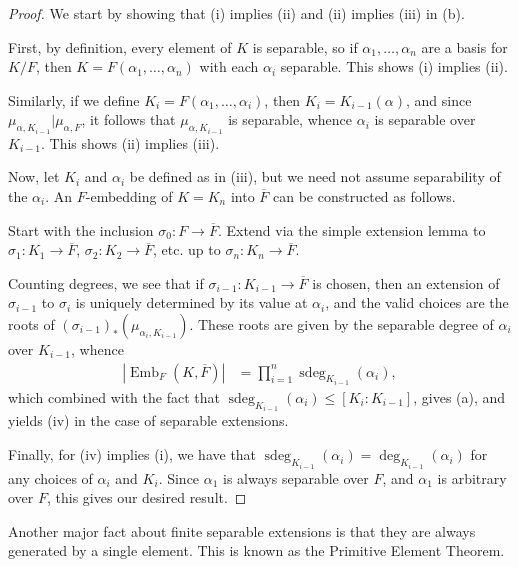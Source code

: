 \documentclass[10pt]{mypackage}
\begin{document}
\begin{proof}
  We start by showing that (i) implies (ii) and (ii) implies (iii) in (b).

  First, by definition, every element of $K$ is separable, so if $\alpha_1,\dots,\alpha_n$ are a basis for $K/F$, then $K = F\left( \alpha_1,\dots,\alpha_n \right)$ with each $\alpha_i$ separable. This shows (i) implies (ii).

  Similarly, if we define $K_i = F\left( \alpha_1,\dots,\alpha_i \right)$, then $K_i = K_{i-1}\left( \alpha \right)$, and since $\mu_{\alpha,K_{i-1}}|\mu_{\alpha,F}$, it follows that $\mu_{\alpha,K_{i-1}}$ is separable, whence $\alpha_i$ is separable over $K_{i-1}$. This shows (ii) implies (iii).

  Now, let $K_i$ and $\alpha_i$ be defined as in (iii), but we need not assume separability of the $\alpha_i$. An $F$-embedding of $K = K_n$ into $ \overline{F} $ can be constructed as follows.

  Start with the inclusion $\sigma_0\colon F\rightarrow \overline{F}$. Extend via the simple extension lemma to $\sigma_1\colon K_1\rightarrow \overline{F}$, $\sigma_2\colon K_2\rightarrow \overline{F}$, etc. up to $\sigma_n\colon K_n\rightarrow \overline{F}$.
  
  Counting degrees, we see that if $\sigma_{i-1}\colon K_{i-1}\rightarrow \overline{F}$ is chosen, then an extension of $\sigma_{i-1}$ to $\sigma_i$ is uniquely determined by its value at $\alpha_i$, and the valid choices are the roots of $ \left( \sigma_{i-1} \right)_{\ast}\left( \mu_{\alpha_i,K_{i-1}} \right) $. These roots are given by the separable degree of $\alpha_i$ over $K_{i-1}$, whence
  \begin{align*}
    \left\vert \operatorname{Emb}_{F}\left( K, \overline{F} \right) \right\vert &= \prod_{i=1}^{n} \operatorname{sdeg}_{K_{i-1}}\left( \alpha_i \right),
  \end{align*}
  which combined with the fact that $ \operatorname{sdeg}_{K_{i-1}}\left( \alpha_i \right) \leq \left[ K_i:K_{i-1} \right] $, gives (a), and yields (iv) in the case of separable extensions.

  Finally, for (iv) implies (i), we have that $\operatorname{sdeg}_{K_{i-1}}\left( \alpha_i \right) = \deg_{K_{i-1}}\left( \alpha_i \right)$ for any choices of $\alpha_i$ and $K_i$. Since $\alpha_1$ is always separable over $F$, and $\alpha_1$ is arbitrary over $F$, this gives our desired result.
\end{proof}
Another major fact about finite separable extensions is that they are always generated by a single element. This is known as the Primitive Element Theorem.
\end{document}
